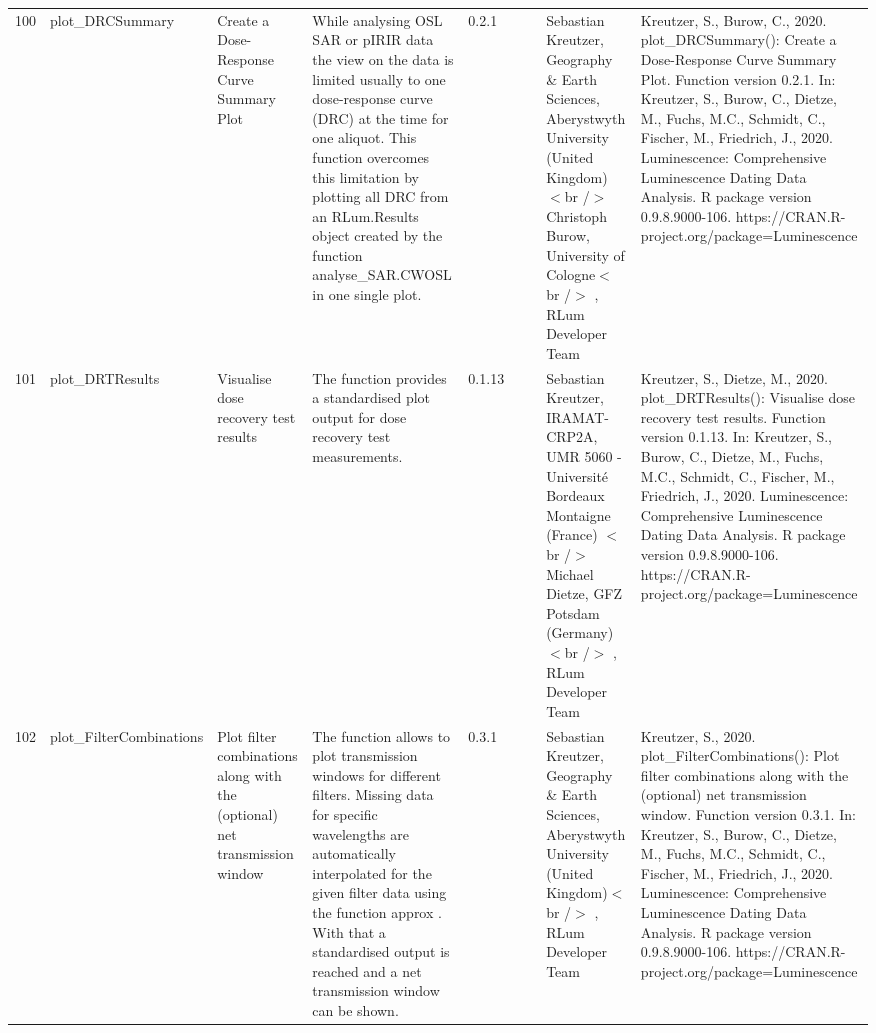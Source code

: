 \begin{table}[ht]
\begin{tabular}{rllllllll}
 \\ 
  100 & plot\_DRCSummary & Create a Dose-Response Curve Summary Plot & While analysing OSL SAR or pIRIR data the view on the data is limited usually to one dose-response curve (DRC) at the time for one aliquot. This function overcomes this limitation by plotting all DRC from an  RLum.Results  object created by the function  analyse\_SAR.CWOSL  in one single plot. & 0.2.1
 &  &  & Sebastian Kreutzer, Geography \& Earth Sciences, Aberystwyth University (United Kingdom)  $<$br /$>$ Christoph Burow, University of Cologne$<$br /$>$ , RLum Developer Team & Kreutzer, S., Burow, C., 2020. plot\_DRCSummary(): Create a Dose-Response Curve Summary Plot. Function version 0.2.1. In: Kreutzer, S., Burow, C., Dietze, M., Fuchs, M.C., Schmidt, C., Fischer, M., Friedrich, J., 2020. Luminescence: Comprehensive Luminescence Dating Data Analysis. R package version 0.9.8.9000-106. https://CRAN.R-project.org/package=Luminescence
 \\ 
  101 & plot\_DRTResults & Visualise dose recovery test results & The function provides a standardised plot output for dose recovery test measurements. & 0.1.13
 &  &  & Sebastian Kreutzer, IRAMAT-CRP2A, UMR 5060 - Université Bordeaux Montaigne (France) $<$br /$>$ Michael Dietze, GFZ Potsdam (Germany)$<$br /$>$ , RLum Developer Team & Kreutzer, S., Dietze, M., 2020. plot\_DRTResults(): Visualise dose recovery test results. Function version 0.1.13. In: Kreutzer, S., Burow, C., Dietze, M., Fuchs, M.C., Schmidt, C., Fischer, M., Friedrich, J., 2020. Luminescence: Comprehensive Luminescence Dating Data Analysis. R package version 0.9.8.9000-106. https://CRAN.R-project.org/package=Luminescence
 \\ 
  102 & plot\_FilterCombinations & Plot filter combinations along with the (optional) net transmission window & The function allows to plot transmission windows for different filters. Missing data for specific wavelengths are automatically interpolated for the given filter data using the function  approx . With that a standardised output is reached and a net transmission window can be shown. & 0.3.1
 &  &  & Sebastian Kreutzer, Geography \& Earth Sciences, Aberystwyth University (United Kingdom)$<$br /$>$ , RLum Developer Team & Kreutzer, S., 2020. plot\_FilterCombinations(): Plot filter combinations along with the (optional) net transmission window. Function version 0.3.1. In: Kreutzer, S., Burow, C., Dietze, M., Fuchs, M.C., Schmidt, C., Fischer, M., Friedrich, J., 2020. Luminescence: Comprehensive Luminescence Dating Data Analysis. R package version 0.9.8.9000-106. https://CRAN.R-project.org/package=Luminescence

\end{tabular}
\end{table}
